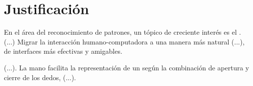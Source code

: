 \section*{Justificación}
En el área del reconocimiento de patrones, un tópico de creciente interés
es el . (...)
 Migrar la interacción humano-computadora
a una manera más natural (...),  de interfaces más efectivas y amigables.

(...). La mano facilita la representación
de un  según la combinación de apertura y cierre
de los dedos, (...).


